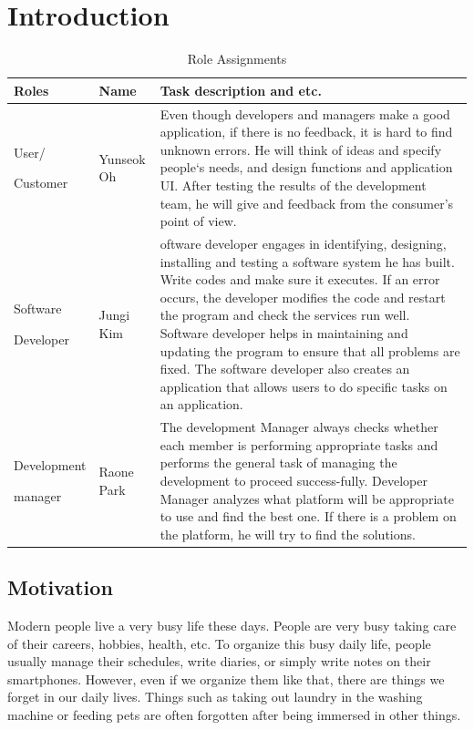 \documentclass[conference]{IEEEtran}
\begin{document}
\section{Introduction}

\begin{table}[h]
\caption{Role Assignments}
\def\arraystretch{1.24} \small
\begin{tabular}{|p{1.8cm}|p{1.4cm}|p{4.4cm}|}
\hline
Roles & Name & Task description and etc. \\ \hline
User/\par Customer&  Yunseok Oh & Even though developers and managers make a good application, if there is no feedback, it is hard to find unknown errors. He will think of ideas and specify people`s needs, and design functions and application UI. After testing the results of the development team, he will give and feedback from the consumer's point of view. \\ \hline

Software \par Developer & Jungi Kim & oftware developer engages in identifying, designing, installing and testing a software system he has built.  Write codes and make sure it executes. If an error occurs, the developer modifies the code and restart the program and check the services run well. Software developer helps in maintaining and updating the program to ensure that all problems are fixed. The software developer also creates an application that allows users to do specific tasks on an application. \\ \hline

Development \par manager & Raone Park & The development Manager always checks whether each member is performing appropriate tasks and performs the general task of managing the development to proceed success-fully. Developer Manager analyzes what platform will be appropriate to use and find the best one. If there is a problem on the platform, he will try to find the solutions. \\ \hline
\end{tabular}
\end{table}

\subsection{Motivation}
Modern people live a very busy life these days. People are very busy taking care of their careers, hobbies, health, etc. To organize this busy daily life, people usually manage their schedules, write diaries, or simply write notes on their smartphones. However, even if we organize them like that, there are things we forget in our daily lives. Things such as taking out laundry in the washing machine or feeding pets are often forgotten after being immersed in other things. 
\end{document}
